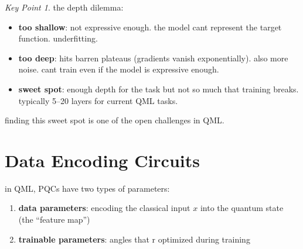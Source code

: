 \documentclass[11pt,a4paper]{article}
\theoremstyle{definition}
\theoremstyle{remark}
\newtheorem*{keypoint}{Key Point}
\begin{document}
\begin{center}
\end{center}

\begin{keypoint}
the depth dilemma:
\begin{itemize}
    \item \textbf{too shallow}: not expressive enough. the model cant represent the target function. underfitting.
    \item \textbf{too deep}: hits barren plateaus (gradients vanish exponentially). also more noise. cant train even if the model is expressive enough.
    \item \textbf{sweet spot}: enough depth for the task but not so much that training breaks. typically 5--20 layers for current QML tasks.
\end{itemize}
finding this sweet spot is one of the open challenges in QML.
\end{keypoint}

\section{Data Encoding Circuits}

in QML, PQCs have two types of parameters:
\begin{enumerate}
    \item \textbf{data parameters}: encoding the classical input $x$ into the quantum state (the ``feature map'')
    \item \textbf{trainable parameters}: angles that r optimized during training
\end{enumerate}
\end{document}
